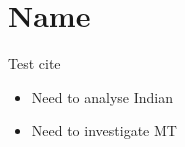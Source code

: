 \chapter{Name}
Test cite \cite{1182306} 
\begin{itemize}
\item Need to analyse Indian 
\item Need to investigate MT 
\end{itemize}

